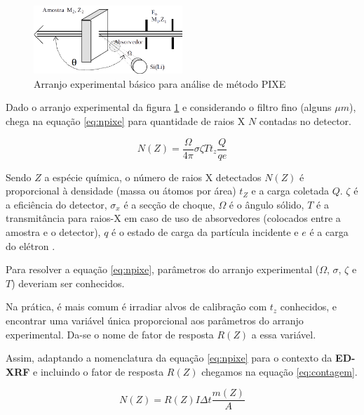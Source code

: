 \begin{figure}[H]
\begin{center} 
  \includegraphics[width=0.5\textwidth]{../inputs/images/arranjopixe.png}
  \caption{Arranjo experimental básico para análise de método PIXE 
           \citep{tabacniks2000} \label{fig:arranjopixe}}
\end{center}
\end{figure}

Dado o arranjo experimental da figura \ref{fig:arranjopixe} e
considerando o filtro fino (alguns $\mu m$),
\citep{tabacniks2000} chega na equação \ref{eq:npixe} para 
quantidade de raios X $N$ contadas no detector. 

\begin{equation}
  \label{eq:npixe}
  N(Z) = \frac{\Omega}{4\pi} \sigma \zeta T t_z \frac{Q}{qe}
\end{equation}

Sendo $Z$ a espécie química, o número de raios X detectados 
$N(Z)$ é proporcional à densidade (massa ou átomos por área) $t_Z$ 
e a carga coletada $Q$.
$\zeta$ é a eficiência do detector, $\sigma_x$ é a secção de choque, 
$\Omega$ é o ângulo sólido, $T$ é a transmitância para raios-X em 
caso de uso de absorvedores (colocados entre a amostra e o detector), 
$q$ é o estado de carga da partícula incidente e 
$e$ é a carga do elétron \citep{tabacniks1983}.

Para resolver a equação \ref{eq:npixe}, parâmetros do arranjo experimental
($\Omega$, $\sigma$, $\zeta$ e $T$) deveriam ser conhecidos. 

Na prática, é mais comum é irradiar alvos de calibração com $t_z$ conhecidos,
e encontrar uma variável única proporcional aos parâmetros do arranjo experimental.
Da-se o nome de fator de resposta $R(Z)$ a essa variável.

Assim, adaptando a nomenclatura da equação \ref{eq:npixe} para o contexto 
da \textbf{ED-XRF} e incluindo o fator de resposta $R(Z)$ chegamos na equação 
\ref{eq:contagem}.

\begin{equation}
  \label{eq:contagem}
  N(Z) = R(Z) I\Delta t \frac{m(Z)}{A}
\end{equation}


